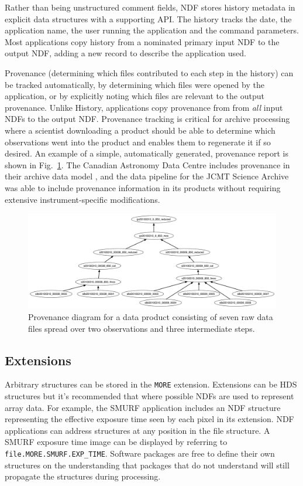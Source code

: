 \documentclass[11pt,twoside]{article}
\begin{document}
Rather than being unstructured comment fields, NDF stores history
metadata in explicit data structures with a supporting API. The
history tracks the date, the application name, the user running the
application and the command parameters. Most applications copy history
from a nominated primary input NDF to the output NDF, adding a new
record to describe the application used.

Provenance (determining which files contributed to each step in the
history) can be tracked automatically, by determining which files were
opened by the application, or by explicitly noting which files are
relevant to the output provenance. Unlike History, applications copy
provenance from from \emph{all} input NDFs to the output
NDF. Provenance tracking is critical for archive processing where a
scientist downloading a product should be able to determine which
observations went into the product and enables them to regenerate it
if so desired. An example of a simple, automatically generated,
provenance report is shown in Fig.\ \ref{fig:P91_f1}. The Canadian
Astronomy Data Centre includes provenance in their archive data model
\citep[CAOM;][]{2012ASPC..461..339D,2013ASPC..475..159R}, and the data
pipeline for the JCMT Science Archive \citep{2008ASPC..394..565J} was
able to include provenance information in its products without
requiring extensive instrument-specific modifications.

\begin{figure}
\includegraphics[width=\textwidth]{P91_f1}
\caption{Provenance diagram for a data product consisting of seven raw
  data files spread over two observations and three intermediate steps.}
\label{fig:P91_f1}
\end{figure}

\subsection{Extensions}

Arbitrary structures can be stored in the \texttt{MORE}
extension. Extensions can be HDS structures but it's recommended that
where possible NDFs are used to represent array data. For example, the
SMURF application includes an NDF structure representing the effective
exposure time seen by each pixel in its extension. NDF applications
can address structures at any position in the file structure. A SMURF
exposure time image can be displayed by referring to
\texttt{file.MORE.SMURF.EXP\_TIME}. Software packages are free to
define their own structures on the understanding that packages that do
not understand will still propagate the structures during processing.
\end{document}
